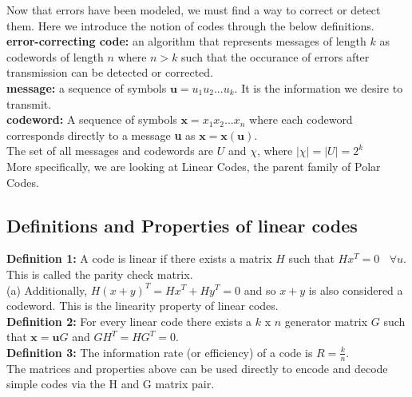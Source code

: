 Now that errors have been modeled, we must find a way to correct or detect them. Here we introduce the notion of codes through the below definitions. \\

\textbf{error-correcting code:} an algorithm that represents messages of length $k$ as codewords of length $n$ where $n > k$ such that the occurance of errors after transmission can be detected or corrected. \\

\textbf{message:} a sequence of symbols $\textbf{u} = u_1u_2 ... u_k$. It is the information we desire to transmit. \\

\textbf{codeword:} A sequence of symbols $\textbf{x} = x_1x_2...x_n$ where each codeword corresponds directly to a message \textbf{u} as $\textbf{x} = \textbf{x}(\textbf{u}).$ \\

The set of all messages and codewords are $U$ and $\chi$, where $|\chi| = |U| = 2^k$ \\

More specifically, we are looking at Linear Codes, the parent family of Polar Codes. \\

\subsection{Definitions and Properties of linear codes}

\vdent

\textbf{Definition 1:} A code is linear if there exists a matrix $H$ such that $Hx^T = 0 \ \ \ \ \forall u$. This is called the parity check matrix.  \\

    (a) Additionally, $H(x+y)^T = Hx^T + Hy^T = 0$ and so $x+y$ is also considered a codeword. This is the linearity property of linear codes.\\


\textbf{Definition 2:} For every linear code there exists a $k \text{ x } n$ generator matrix $G$ such that $\textbf{x} = \textbf{u}G$ and $GH^T = HG^T = 0$. \\

\textbf{Definition 3:} The information rate (or efficiency) of a code is $R = \frac{k}{n}$. \\

The matrices and properties above can be used directly to encode and decode simple codes via the H and G matrix pair.

